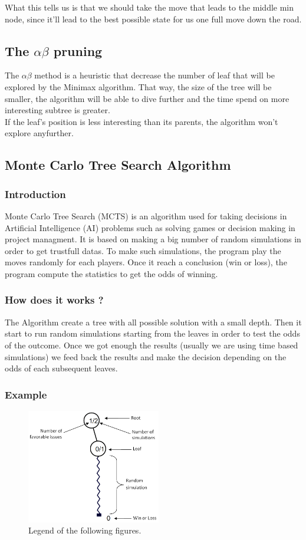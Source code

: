 What this tells us is that we should take the move that leads to the middle min node, since it'll lead to the best possible state for us one full move down the road.

\subsection{The \ensuremath{\alpha\beta} pruning} %
The \ensuremath{\alpha\beta} method is a heuristic that decrease the number of leaf that will be explored by the Minimax algorithm. That way, the size of the tree will be smaller, the algorithm will be able to dive further and the time spend on more interesting subtree is greater.\\
If the leaf's position is less interesting than its parents, the algorithm won't explore anyfurther.

\subsection{Monte Carlo Tree Search Algorithm}
\subsubsection{Introduction}
Monte Carlo Tree Search (MCTS) is an algorithm used for taking decisions in Artificial Intelligence (AI) problems such as solving games or decision making in project managment. It is based on making a big number of random simulations in order to get trustfull datas. To make such simulations, the program play the moves randomly for each players. Once it reach a conclusion (win or loss), the program compute the statistics to get the odds of winning.
\subsubsection{How does it works ?}
The Algorithm create a tree with all possible solution with a small depth.
Then it start to run random simulations starting from the leaves in order to test the odds of the outcome.
Once we got enough the results (usually we are using time based simulations) we feed back the results and make the decision depending on the odds of each subsequent leaves.
\subsubsection{Example}
\label{sec:example}
\begin{figure}[H]
\centering
\includegraphics[height=5cm]{1_Presentation/1.2_Algorithm_MCTS_Benoit/img/schema.png}
\caption{\label{fig:schema}Legend of the following figures.}
\end{figure}

